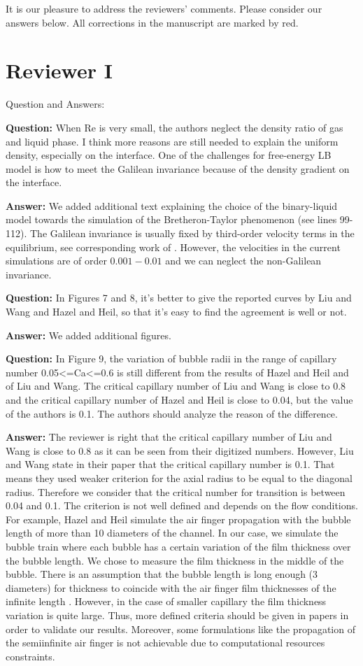 \documentclass{article}
\begin{document}
It is our pleasure to address the reviewers' comments. Please consider our answers below. All corrections in the manuscript are marked by red.
\section{Reviewer I}
Question and Answers:

\textbf{Question:} When Re is very small, the authors neglect the density ratio of gas and liquid phase. I think more
reasons are still needed to explain the uniform density, especially on the interface. One of the
challenges for free-energy LB model is how to meet the Galilean invariance because of the density
gradient on the interface.

\textbf{Answer:}  We added additional text explaining the choice of the binary-liquid model towards the simulation
of the Bretheron-Taylor phenomenon (see lines 99-112). The Galilean invariance is usually fixed by
third-order velocity terms in the equilibrium, see corresponding work of \citet{qian-galilean}.
However, the velocities in the current simulations are of order $0.001-0.01$ and we can neglect the
non-Galilean invariance.

\textbf{Question:} In Figures 7 and 8, it's better to give the reported curves by Liu and Wang and Hazel and Heil, so
that it's easy to find the agreement is well or not.

\textbf{Answer:} We added additional figures. 

\textbf{Question:} In Figure 9, the variation of bubble radii in the range of capillary number 0.05<=Ca<=0.6 is
still different from the results of Hazel and Heil and of Liu and Wang. The critical capillary
number of Liu and Wang is close to 0.8 and the critical capillary number of Hazel and Heil is close
to 0.04, but the value of the authors is 0.1. The authors should analyze the reason of the
difference.

\textbf{Answer:} The reviewer is right that the critical capillary number of Liu and Wang is close
to 0.8 as it can be seen from their digitized numbers. However, Liu and Wang state in their paper
that the critical capillary number is 0.1. That means they used weaker criterion for the axial
radius to be equal to the diagonal radius. Therefore we consider that the critical number for
transition is between 0.04 and 0.1. The criterion is not well defined and depends on the flow
conditions. For example, Hazel and Heil simulate the air finger propagation with the bubble length
of more than 10 diameters of the channel. In our case, we simulate the bubble train where each
bubble has a certain variation of the film thickness over the bubble length. We chose to measure the
film thickness in the middle of the bubble. There is an assumption that the bubble length is long
enough (3 diameters) for thickness to coincide with the air finger film thicknesses of the infinite
length \cite{cerro-space}. However, in the case of smaller capillary the film thickness variation
is quite large. Thus, more defined criteria should be given in papers in order to validate our
results. Moreover, some formulations like the propagation of the semiinfinite air finger is not
achievable due to computational resources constraints.
\end{document}
